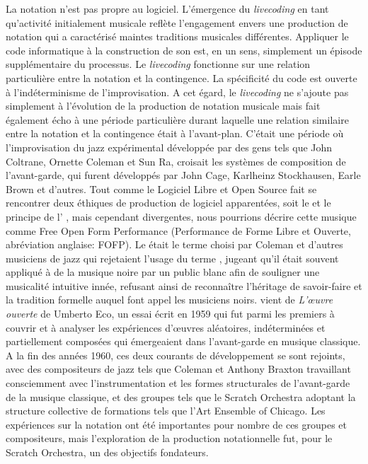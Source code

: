{La notation n'est pas propre au logiciel. L'\'emergence du
{\em livecoding} en tant qu'activit\'e initialement musicale
refl\`ete l'engagement envers une production de notation qui a
caract\'eris\'e maintes traditions musicales diff\'erentes. Appliquer
le code informatique \`a la construction de son est, en un sens,
simplement un \'episode suppl\'ementaire du processus. Le
{\em livecoding} fonctionne sur une relation particuli\`ere entre la
notation et la contingence. La sp\'ecificit\'e du code est ouverte \`a
l'ind\'eterminisme de l'improvisation. A cet \'egard, le
{\em livecoding} ne s'ajoute pas simplement \`a l'\'evolution de la
production de notation musicale mais fait \'egalement \'echo \`a une
p\'eriode particuli\`ere durant laquelle une relation similaire entre
la notation et la contingence \'etait \`a l'avant{}-plan. C'\'etait une
p\'eriode o\`u l'improvisation du jazz exp\'erimental d\'evelopp\'ee
par des gens tels que John Coltrane, Ornette Coleman et Sun Ra,
croisait les syst\`emes de composition  de l'avant{}-garde,
qui furent d\'evelopp\'es par John Cage, Karlheinz Stockhausen, Earle
Brown et d'autres. Tout comme le Logiciel Libre et Open Source fait se
rencontrer deux \'ethiques de production de logiciel apparent\'ees,
soit le  et le principe de l' , mais
cependant divergentes, nous pourrions d\'ecrire cette musique comme
Free Open Form Performance (Performance de Forme Libre et Ouverte,
abr\'eviation anglaise: FOFP). Le  \'etait le terme choisi
par Coleman et d'autres musiciens de jazz qui rejetaient l'usage du
terme , jugeant qu'il \'etait souvent appliqu\'e \`a de
la musique noire par un public blanc afin de souligner une musicalit\'e
intuitive inn\'ee, refusant ainsi de reconna\^itre l'h\'eritage de
savoir{}-faire et la tradition formelle auquel font appel les musiciens
noirs.  vient de {\em L'{\oe}uvre ouverte} de Umberto Eco,
un essai \'ecrit en 1959 qui fut parmi les premiers \`a couvrir et \`a
analyser les exp\'eriences d'{\oe}uvres al\'eatoires, ind\'etermin\'ees
et partiellement compos\'ees qui \'emergeaient dans l'avant{}-garde en
musique classique. A la fin des ann\'ees 1960, ces deux courants de
d\'eveloppement se sont rejoints, avec des compositeurs de jazz tels
que Coleman et Anthony Braxton travaillant consciemment avec
l'instrumentation et les formes structurales de l'avant{}-garde de la
musique classique, et des groupes tels que le Scratch Orchestra
adoptant la structure collective de formations tels que l'Art Ensemble
of Chicago. Les exp\'eriences sur la notation ont \'et\'e importantes
pour nombre de ces groupes et compositeurs, mais l'exploration de la
production notationnelle fut, pour le Scratch Orchestra, un des
objectifs fondateurs.

}
